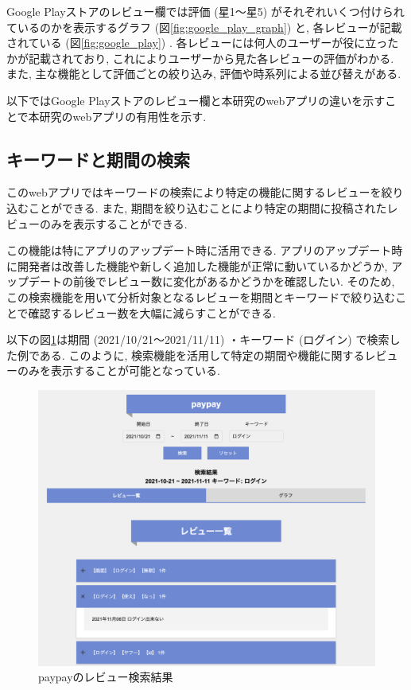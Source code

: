 Google Playストアのレビュー欄では評価 (星1〜星5) がそれぞれいくつ付けられているのかを表示するグラフ (図\ref{fig:google_play_graph}) と, 各レビューが記載されている (図\ref{fig:google_play}) . 各レビューには何人のユーザーが役に立ったかが記載されており, これによりユーザーから見た各レビューの評価がわかる. 
また, 主な機能として評価ごとの絞り込み, 評価や時系列による並び替えがある. 

以下ではGoogle Playストアのレビュー欄と本研究のwebアプリの違いを示すことで本研究のwebアプリの有用性を示す. 

\subsection{キーワードと期間の検索}
このwebアプリではキーワードの検索により特定の機能に関するレビューを絞り込むことができる. また, 期間を絞り込むことにより特定の期間に投稿されたレビューのみを表示することができる.  

この機能は特にアプリのアップデート時に活用できる. アプリのアップデート時に開発者は改善した機能や新しく追加した機能が正常に動いているかどうか, アップデートの前後でレビュー数に変化があるかどうかを確認したい. そのため, この検索機能を用いて分析対象となるレビューを期間とキーワードで絞り込むことで確認するレビュー数を大幅に減らすことができる. 

以下の図\ref{fig:paypay_search}は期間 (2021/10/21〜2021/11/11) ・キーワード (ログイン) で検索した例である. このように, 検索機能を活用して特定の期間や機能に関するレビューのみを表示することが可能となっている. 
\begin{figure}[H]
  \centering
  \includegraphics[scale=0.3]
    {contents/images/paypay_search.png}
  \caption{paypayのレビュー検索結果\label{fig:paypay_search}}
\end{figure}

